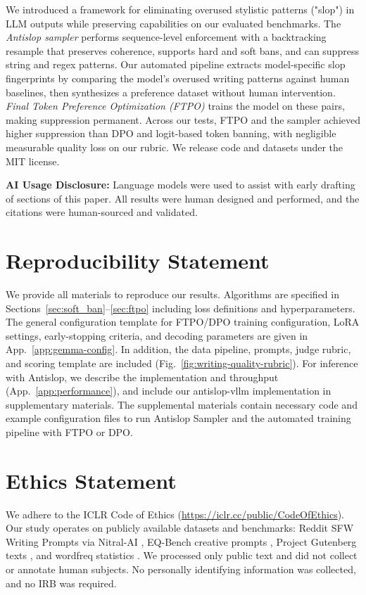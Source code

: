 \documentclass[11pt]{article}
\begin{document}
We introduced a framework for eliminating overused stylistic patterns ("slop") in LLM outputs while preserving capabilities on our evaluated benchmarks. The \emph{Antislop sampler} performs sequence-level enforcement with a backtracking resample that preserves coherence, supports hard and soft bans, and can suppress  string and regex patterns. Our automated pipeline extracts model-specific slop fingerprints by comparing the model's overused writing patterns against human baselines, then synthesizes a preference dataset without human intervention. \emph{Final Token Preference Optimization (FTPO)} trains the model on these pairs, making suppression permanent. Across our tests, FTPO and the sampler achieved higher suppression than DPO and logit-based token banning, with negligible measurable quality loss on our rubric. We release code and datasets under the MIT license.

\textbf{AI Usage Disclosure:} Language models were used to assist with early drafting of sections of this paper. All results were human designed and performed, and the citations were human-sourced and validated.


\section*{Reproducibility Statement}
We provide all materials to reproduce our results. Algorithms are specified in Sections~\ref{sec:soft_ban}–\ref{sec:ftpo} including loss definitions and hyperparameters. The general configuration template for FTPO/DPO training configuration, LoRA settings, early-stopping criteria, and decoding parameters are given in App.~\ref{app:gemma-config}. In addition, the data pipeline, prompts, judge rubric, and scoring template are included (Fig.~\ref{fig:writing-quality-rubric}). For inference with Antislop, we describe the implementation and throughput (App.~\ref{app:performance}), and include our antislop-vllm implementation in supplementary materials. The supplemental materials contain necessary code and example configuration files to run Antislop Sampler and the automated training pipeline with FTPO or DPO.


\section*{Ethics Statement}
We adhere to the ICLR Code of Ethics (\url{https://iclr.cc/public/CodeOfEthics}). Our study operates on publicly available datasets and benchmarks: Reddit SFW Writing Prompts via Nitral-AI \citep{nitral_reddit_sfw_wp_sharegpt}, EQ-Bench creative prompts \citep{paech2023eqbench}, Project Gutenberg texts \citep{project_gutenberg}, and wordfreq statistics \citep{robyn_speer_2018_1443582}. We processed only public text and did not collect or annotate human subjects. No personally identifying information was collected, and no IRB was required.
\end{document}
